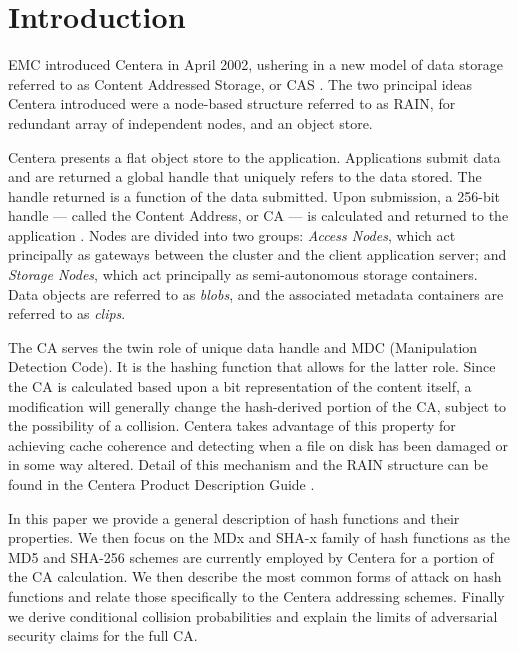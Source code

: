 \section{Introduction}\label{sec:1}

EMC introduced Centera in April 2002, ushering in a new model of data
storage referred to as Content Addressed Storage, or CAS
\cite{ref8}. The two principal ideas Centera introduced were
a node-based structure referred to as RAIN, for redundant array of
independent nodes, and an object store.

Centera presents a flat object store to the application. Applications
submit data and are returned a global handle that uniquely refers to the
data stored. The handle returned is a function of the data submitted.
Upon submission, a 256-bit handle --- called the Content Address, or CA
--- is calculated and returned to the application
\cite{ref20}. Nodes are divided into two groups: \emph{Access
Nodes}, which act principally as gateways between the cluster and the
client application server; and \emph{Storage Nodes}, which act
principally as semi-autonomous storage containers. Data objects are
referred to as \emph{blobs}, and the associated metadata containers are
referred to as \emph{clips}.

The CA serves the twin role of unique data handle and MDC (Manipulation
Detection Code). It is the hashing function that allows for the latter
role. Since the CA is calculated based upon a bit representation of the
content itself, a modification will generally change the hash-derived
portion of the CA, subject to the possibility of a collision. Centera takes advantage of this property for achieving cache
coherence and detecting when a file on disk has been damaged or in some
way altered. Detail of this mechanism and the RAIN structure can be
found in the Centera Product Description Guide \cite{ref9}.

In this paper we provide a general description of hash functions and
their properties. We then focus on the MDx and SHA-x family of hash
functions as the MD5 and SHA-256 schemes are currently employed by
Centera for a portion of the CA calculation. We then describe the most
common forms of attack on hash functions and relate those specifically
to the Centera addressing schemes. Finally we derive conditional collision probabilities and explain the
limits of adversarial security claims for the full CA.
